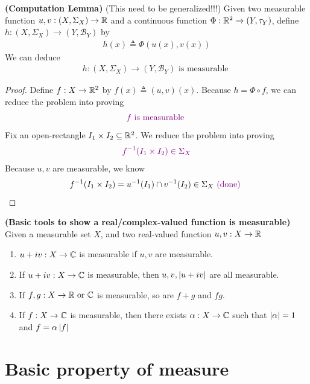\documentclass{report}
\begin{document}
\begin{lemma}
\textbf{(Computation Lemma)} (This need to be generalized!!!) Given two measurable function $u,v:(X,\Sigma_X)\rightarrow \mathbb{R}$ and a continuous function $\Phi:\mathbb{R}^2 \rightarrow (Y,\tau_Y)$, define $h:(X,\Sigma_X)\rightarrow (Y,\mathcal{B}_Y)$ by
\begin{align*}
h(x)\triangleq \Phi(u(x),v(x))
\end{align*}
We can deduce
\begin{align*}
h:(X,\Sigma_X)\rightarrow (Y,\mathcal{B}_Y)\text{ is measurable }
\end{align*}
\end{lemma}
\begin{proof}
Define $f:X\rightarrow \mathbb{R}^2$ by $f(x)\triangleq (u,v)(x)$. Because $h=\Phi \circ f$, we can reduce the problem into proving
\begin{align*}
\textcolor{violet}{f\text{ is measurable }}
\end{align*}
Fix an open-rectangle $I_1\times I_2 \subseteq \mathbb{R}^2$. We reduce the problem into proving 
\begin{align*}
  \textcolor{violet}{f^{-1}(I_1\times I_2) \in \Sigma_X}
\end{align*}
Because $u,v$ are measurable, we know
\begin{align*}
f^{-1}(I_1\times I_2)=u^{-1}(I_1)\cap v^{-1}(I_2) \in \Sigma_X \textcolor{violet}{\text{ (done) }}
\end{align*}
\end{proof}
\begin{theorem}
\textbf{(Basic tools to show a real/complex-valued function is measurable)} Given a measurable set $X$, and two real-valued function $u,v:X\rightarrow \mathbb{R}$
\begin{enumerate}[label=(\alph*)]
  \item  $u+iv:X\rightarrow \mathbb{C}$ is measurable if  $u,v$ are measurable.
  \item If  $u+iv:X\rightarrow \mathbb{C}$ is measurable, then  $u,v,\left|u+iv\right|$ are all measurable. 
  \item If  $f,g:X\rightarrow \mathbb{R}\text{ or }\mathbb{C}$ is measurable, so are $f+g$ and $fg$.
  \item If $f:X\rightarrow \mathbb{C}$ is measurable, then there exists $\alpha :X\rightarrow \mathbb{C}$ such that $\left|\alpha \right|=1$ and $f=\alpha \left|f\right|$ 
\end{enumerate}
\end{theorem}
\section{Basic property of measure}
\end{document}
